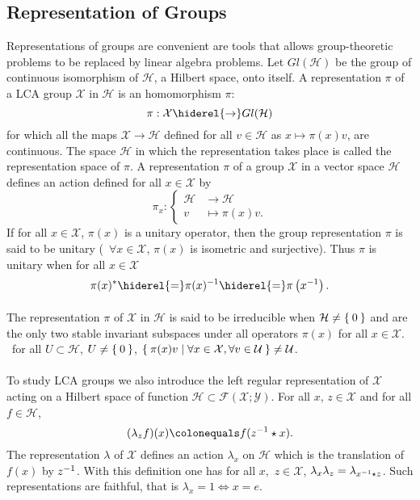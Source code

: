 \subsection{Representation of Groups}
Representations of groups are convenient are tools that allows group\--\-theo\-re\-tic problems to be replaced by linear algebra problems. Let $Gl(\mathcal{H})$ be the group of continuous isomorphism of $\mathcal{H}$, a Hilbert space, onto itself. A representation $\pi$ of a \acs{LCA} group $\mathcal{X}$ in $\mathcal{H}$ is an homomorphism $\pi$:
\begin{dmath*}
\pi:\mathcal{X}\hiderel{\to} Gl(\mathcal{H})
\end{dmath*}
for which all the maps $\mathcal{X}\to\mathcal{H}$ defined for all $v\in\mathcal{H}$ as $x\mapsto \pi(x)v$, are continuous. The space $\mathcal{H}$ in which the representation takes place
is called the representation space of $\pi$. A representation $\pi$ of a group $\mathcal{X}$ in a vector space $\mathcal{H}$ defines an action defined for all $x\in\mathcal{X}$ by
\begin{dmath*}
\pi_x:\begin{cases}
\mathcal{H}&\to\mathcal{H} \\
v &\mapsto \pi(x)v.
\end{cases}
\end{dmath*}
If for all $x\in\mathcal{X}$, $\pi(x)$ is a unitary operator, then the group representation $\pi$ is said to be unitary (\ie~$\forall x\in\mathcal{X}$, $\pi(x)$ is isometric and surjective). Thus $\pi$ is unitary when for all $x\in\mathcal{X}$
\begin{dmath*}
\pi(x)^*\hiderel{=}\pi(x)^{-1}\hiderel{=}\pi\left(x^{-1}\right).
\end{dmath*}
\paragraph{}
The representation $\pi$ of $\mathcal{X}$ in $\mathcal{H}$ is said to be irreducible when $\mathcal{H}\neq \Set{0}$ and are the only two stable invariant subspaces under all operators $\pi(x)$ for all $x\in\mathcal{X}$. \Ie~for all $ U\subset\mathcal{H}$, $U\neq \Set{0}$, $\Set{\pi(x)v|\forall x\in\mathcal{X},\forall v\in\mathcal{U}}\neq \mathcal{U}$.
\paragraph{}
To study \acs{LCA} groups we also introduce the left regular representation of $\mathcal{X}$ acting on a Hilbert space of function $\mathcal{H}\subset\mathcal{F}(\mathcal{X};\mathcal{Y})$. For all $x$, $z\in\mathcal{X}$ and for all $f\in\mathcal{H}$,
\begin{dmath*}
(\lambda_z f)(x)\colonequals f(\inv{z}\groupop x).
\end{dmath*}
The representation $\lambda$ of $\mathcal{X}$ defines an action $\lambda_x$ on $\mathcal{H}$ which is the translation of $f(x)$ by ${z}^{-1}$. With this definition one has for all $x,$ $z\in\mathcal{X}$, $\lambda_x\lambda_z=\lambda_{{x}^{-1}\star z}$. Such representations are faithful, that is $\lambda_x=1 \iff x=e$.

